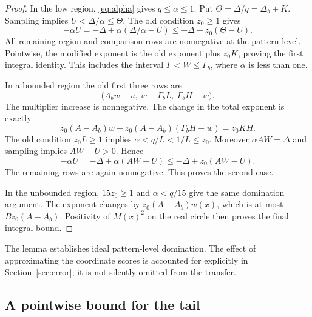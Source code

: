 \documentclass[11pt,a4paper]{article}
\theoremstyle{remark}
\begin{document}
\begin{proof}
In the low region, \eqref{eq:alpha} gives $q\le\alpha\le1$. Put
$\Theta=\Delta/q=\Delta_b+K$. Sampling implies
$U<\Delta/\alpha\le\Theta$. The old condition $z_0\ge1$ gives
\begin{equation}
\label{eq:low-domination}
 -\alpha U
 =-\Delta+\alpha(\Delta/\alpha-U)
 \le-\Delta+z_0(\Theta-U).
\end{equation}
All remaining region and comparison rows are nonnegative at the
pattern level. Pointwise, the modified exponent is the old exponent
plus $z_0K$, proving the first integral identity. This includes the
interval $\Gamma<W\le\Gamma_b$, where $\alpha$ is less than one.

In a bounded region the old first three rows are
\[
 \bigl(A_bw-u,\ w-\Gamma_bL,\ \Gamma_bH-w\bigr).
\]
The multiplier increase is nonnegative. The change in the total
exponent is exactly
\begin{equation}
\label{eq:band-cancellation}
 z_0(A-A_b)w+z_0(A-A_b)(\Gamma_bH-w)=z_0KH.
\end{equation}
The old condition $z_0L\ge1$ implies
$\alpha<q/L<1/L\le z_0$. Moreover $\alpha AW=\Delta$ and sampling
implies $AW-U>0$. Hence
\begin{equation}
\label{eq:band-domination}
 -\alpha U=-\Delta+\alpha(AW-U)
 \le-\Delta+z_0(AW-U).
\end{equation}
The remaining rows are again nonnegative. This proves the second case.

In the unbounded region, $15z_0\ge1$ and $\alpha<q/15$ give the same
domination argument. The exponent changes by $z_0(A-A_b)w(x)$, which
is at most $Bz_0(A-A_b)$. Positivity of $M(x)^2$ on the real circle
then proves the final integral bound.
\end{proof}

The lemma establishes ideal pattern-level domination. The effect of
approximating the coordinate scores is accounted for explicitly in
Section~\ref{sec:error}; it is not silently omitted from the transfer.

\subsection{A pointwise bound for the tail}
\end{document}
